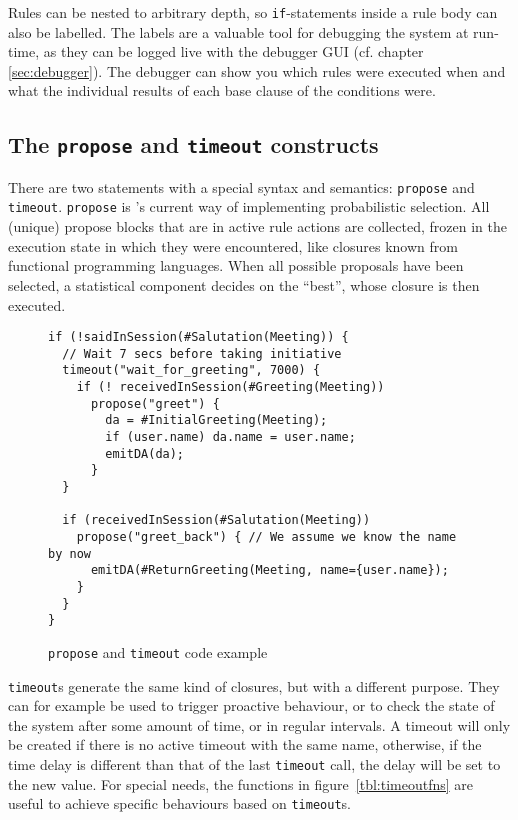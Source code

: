 Rules can be nested to arbitrary depth, so \texttt{if}-statements inside a rule
body can also be labelled. The labels are a valuable tool for debugging the
system at run-time, as they can be logged live with the debugger GUI
(cf. chapter \ref{sec:debugger}). The debugger can show you which rules were
executed when and what the individual results of each base clause of the
conditions were.

\subsection{The \texttt{propose} and \texttt{timeout} constructs}

There are two statements with a special syntax and semantics: \texttt{propose}
and \texttt{timeout}. \texttt{propose} is \vonda's current way of implementing
probabilistic selection. All (unique) propose blocks that are in active rule
actions are collected, frozen in the execution state in which they were
encountered, like closures known from functional programming languages. When
all possible proposals have been selected, a statistical component decides
on the ``best'', whose closure is then executed.

\begin{figure}[h]
  \centering\small%
\begin{lstlisting}
if (!saidInSession(#Salutation(Meeting)) {
  // Wait 7 secs before taking initiative
  timeout("wait_for_greeting", 7000) {
    if (! receivedInSession(#Greeting(Meeting))
      propose("greet") {
        da = #InitialGreeting(Meeting);
        if (user.name) da.name = user.name;
        emitDA(da);
      }
  }

  if (receivedInSession(#Salutation(Meeting))
    propose("greet_back") { // We assume we know the name by now
      emitDA(#ReturnGreeting(Meeting, name={user.name});
    }
  }
}
\end{lstlisting}\vspace*{-3ex}
  \caption{\label{fig:propose}\texttt{propose} and \texttt{timeout} code example}
\end{figure}

\texttt{timeout}s generate the same kind of closures, but with a different
purpose. They can for example be used to trigger proactive behaviour, or to
check the state of the system after some amount of time, or in regular
intervals. A timeout will only be created if there is no active timeout with
the same name, otherwise, if the time delay is different than that of the last
\texttt{timeout} call, the delay will be set to the new value. For special
needs, the functions in figure~\ref{tbl:timeoutfns} are useful to achieve
specific behaviours based on \texttt{timeout}s.

